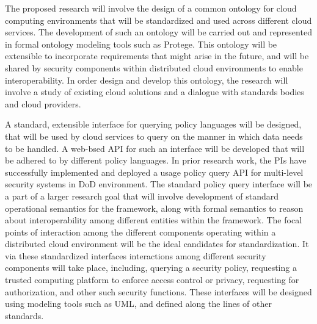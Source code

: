 \documentclass[times, 10pt,twocolumn]{article}
\begin{document}
The proposed research will  involve the design of a common ontology for cloud computing environments that will be standardized and used across different cloud services. The development of such an ontology will be carried out and represented in formal ontology modeling tools such as Protege. This ontology will be extensible to incorporate requirements that might arise in the future, and will be shared by security components within distributed cloud environments to enable interoperability. In order design and develop this ontology, the research will involve a study of existing cloud solutions and a dialogue with standards bodies and cloud providers.

A standard, extensible interface for querying policy languages will be designed, that will be used by cloud services to query on the manner in which data needs to be handled. A web-bsed API for such an interface will be developed that will be adhered to by different policy languages. In prior research work, the PIs have successfully implemented and deployed a usage policy query API for multi-level security systems in DoD environment. The standard policy query interface will be a part of a larger research goal that will involve development of standard operational semantics for the framework, along with formal semantics to reason about interoperability among different entities within the framework. The focal points of interaction among the different components operating within a distributed cloud environment will be the ideal candidates for standardization. It via these standardized interfaces interactions among different security components will take place, including, querying a security policy, requesting a trusted computing platform to enforce access control or privacy, requesting for authorization, and other such security functions. These interfaces will be designed using modeling tools such as UML, and defined along the lines of other standards. 
\end{document}
